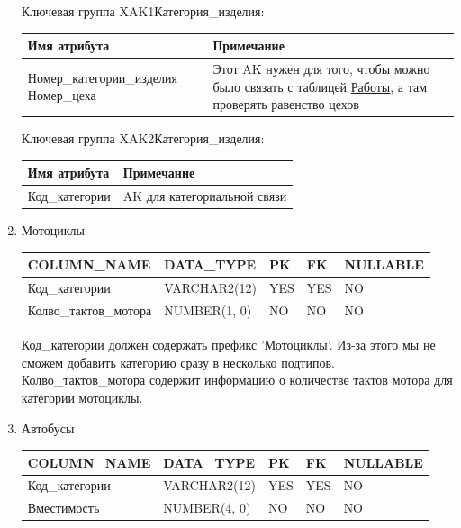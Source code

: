 \begin{enumerate}
    Ключевая группа XAK1Категория\_изделия:

    \begin{tabular}{|p{7cm}|p{9.3cm}|} \hline

        {\bf Имя атрибута} & {\bf Примечание} \\ \hline
        Номер\_категории\_изделия \newline Номер\_цеха & Этот AK нужен для того, чтобы можно было связать с таблицей \underline{Работы}, а там проверять равенство цехов \\ \hline

    \end{tabular}

    Ключевая группа XAK2Категория\_изделия:

    \begin{tabular}{|p{7cm}|p{9.3cm}|} \hline

        {\bf Имя атрибута} & {\bf Примечание} \\ \hline
        Код\_категории & AK для категориальной связи \\ \hline

    \end{tabular}

    \item{Мотоциклы}

    \begin{tabular}{|p{7cm}|p{3cm}|p{1cm}|p{1cm}|p{3cm}|} \hline

        {\bf COLUMN\_NAME} & {\bf DATA\_TYPE} & {\bf PK} & {\bf FK} & {\bf NULLABLE} \\ \hline
        Код\_категории & VARCHAR2(12) & YES & YES & NO \\ \hline
        Колво\_тактов\_мотора & NUMBER(1, 0) & NO & NO & NO \\ \hline

    \end{tabular}

    Код\_категории должен содержать префикс 'Мотоциклы'. Из-за этого мы не сможем добавить категорию сразу в несколько подтипов.
    Колво\_тактов\_мотора содержит информацию о количестве тактов мотора для категории мотоциклы.

    \item{Автобусы}

    \begin{tabular}{|p{7cm}|p{3cm}|p{1cm}|p{1cm}|p{3cm}|} \hline

        {\bf COLUMN\_NAME} & {\bf DATA\_TYPE} & {\bf PK} & {\bf FK} & {\bf NULLABLE} \\ \hline
        Код\_категории & VARCHAR2(12) & YES & YES & NO \\ \hline
        Вместимость & NUMBER(4, 0) & NO & NO & NO \\ \hline


\end{tabular}
\end{enumerate}
